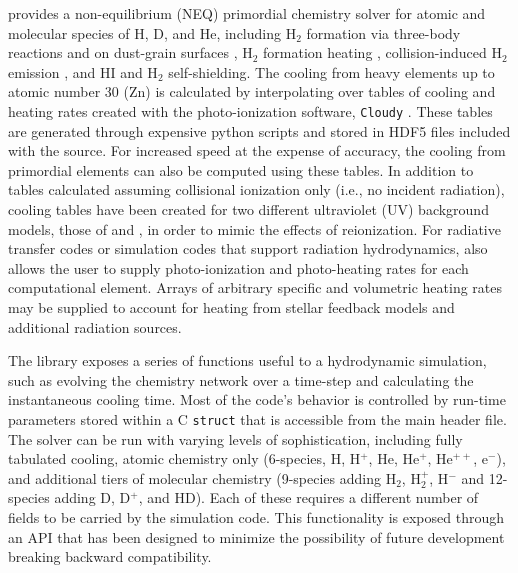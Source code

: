 \grackle{} provides a non-equilibrium (NEQ) primordial chemistry solver for
atomic and molecular species of H, D, and He, including H$_{2}$
formation via three-body reactions \citep{2002Sci...295...93A,
2011ApJ...726...55T} and on dust-grain surfaces
\citep{1979ApJS...41..555H, 2000ApJ...534..809O, 2014ApJ...783...75M},
H$_{2}$ formation 
heating \citep{2009Sci...325..601T}, collision-induced H$_{2}$
emission \citep{2004MNRAS.348.1019R}, and HI
\citep{2013MNRAS.430.2427R} and H$_{2}$ \citep{2012MNRAS.425L..51W}
self-shielding.  The cooling from heavy elements up to atomic number
30 (Zn) is calculated by interpolating over tables of cooling and
heating rates created with the photo-ionization software,
\texttt{Cloudy} \citep{2013RMxAA..49..137F}.  These
tables are generated through expensive python scripts and stored in HDF5 files
included with the \grackle{} source.  For
increased speed at the expense of accuracy, the cooling from
primordial elements can also be computed using these tables.  In
addition to tables calculated assuming collisional ionization only
(i.e., no incident radiation), cooling tables have been created for two
different ultraviolet (UV) background models, those of \citet{2009ApJ...703.1416F}
and \citet{2012ApJ...746..125H}, in order to mimic the effects of
reionization.  For radiative transfer codes or simulation codes that
support radiation hydrodynamics, \grackle{} also allows the user to supply
photo-ionization and photo-heating rates for each computational
element.  Arrays of arbitrary specific and volumetric heating
rates may be supplied to account for heating from stellar feedback
models and additional radiation sources.

The \grackle{} library exposes a series of functions useful to a
hydrodynamic simulation, such as evolving the chemistry network over a
time-step and calculating the instantaneous cooling time.
Most of the
code's behavior is controlled by run-time parameters stored within a C
\texttt{struct} that is accessible from the main \grackle{} header
file.  The solver can be run with varying levels of sophistication,
including fully tabulated cooling, atomic chemistry only (6-species,
H, H$^{+}$, He, He$^{+}$, He$^{++}$, e$^{-}$), and additional tiers of
molecular chemistry (9-species adding H$_{2}$, H$_{2}^{+}$, H$^{-}$
and 12-species adding D, D$^{+}$, and HD).  Each of these requires a
different number of fields to be carried by the simulation code.  This
functionality is exposed through an API that has been designed to
minimize the possibility of future development breaking backward
compatibility.

